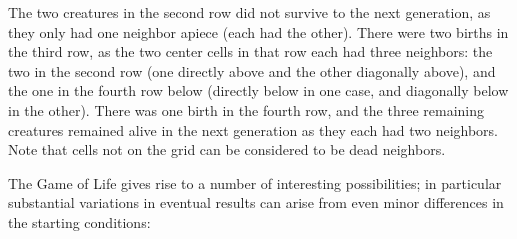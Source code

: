\documentclass[11pt]{article}
\begin{document}
    \vspace{-2mm}

    The two creatures in the second row did not survive to the next
  generation, as they only had one neighbor apiece (each had the other).
  There were two births in the third row, as the two center cells in that
  row each had three neighbors: the two in the second row (one directly
  above and the other diagonally above), and the one in the fourth row below
  (directly below in one case, and diagonally below in the other).  There
  was one birth in the fourth row, and the three remaining creatures
  remained alive in the next generation as they each had two neighbors.
  Note that cells not on the grid can be considered to be dead neighbors.

    The Game of Life gives rise to a number of interesting possibilities; in
  particular substantial variations in eventual results can arise from even
  minor differences in the starting conditions:

    \vspace{-2.5mm}
\end{document}
